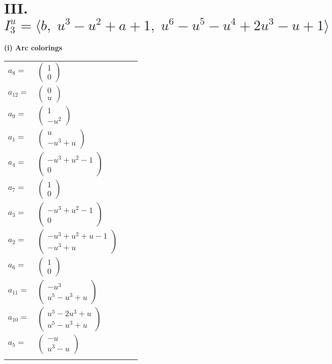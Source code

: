 \documentclass[1p]{elsarticle_modified}
\theoremstyle{definition}
\begin{document}
\centering \section*{III. $I^u_{3}= \langle b,\;u^3- u^2+a+1,\;u^6- u^5- u^4+2 u^3- u+1 \rangle$}
\flushleft \textbf{(i) Arc colorings}\\
\begin{tabular}{m{7pt} m{180pt} m{7pt} m{180pt} }
\flushright $a_{8}=$&$\begin{pmatrix}1\\0\end{pmatrix}$ \\
\flushright $a_{12}=$&$\begin{pmatrix}0\\u\end{pmatrix}$ \\
\flushright $a_{9}=$&$\begin{pmatrix}1\\- u^2\end{pmatrix}$ \\
\flushright $a_{1}=$&$\begin{pmatrix}u\\- u^3+u\end{pmatrix}$ \\
\flushright $a_{4}=$&$\begin{pmatrix}- u^3+u^2-1\\0\end{pmatrix}$ \\
\flushright $a_{7}=$&$\begin{pmatrix}1\\0\end{pmatrix}$ \\
\flushright $a_{3}=$&$\begin{pmatrix}- u^3+u^2-1\\0\end{pmatrix}$ \\
\flushright $a_{2}=$&$\begin{pmatrix}- u^3+u^2+u-1\\- u^3+u\end{pmatrix}$ \\
\flushright $a_{6}=$&$\begin{pmatrix}1\\0\end{pmatrix}$ \\
\flushright $a_{11}=$&$\begin{pmatrix}- u^3\\u^5- u^3+u\end{pmatrix}$ \\
\flushright $a_{10}=$&$\begin{pmatrix}u^5-2 u^3+u\\u^5- u^3+u\end{pmatrix}$ \\
\flushright $a_{5}=$&$\begin{pmatrix}- u\\u^3- u\end{pmatrix}$\\&\end{tabular}
\end{document}
